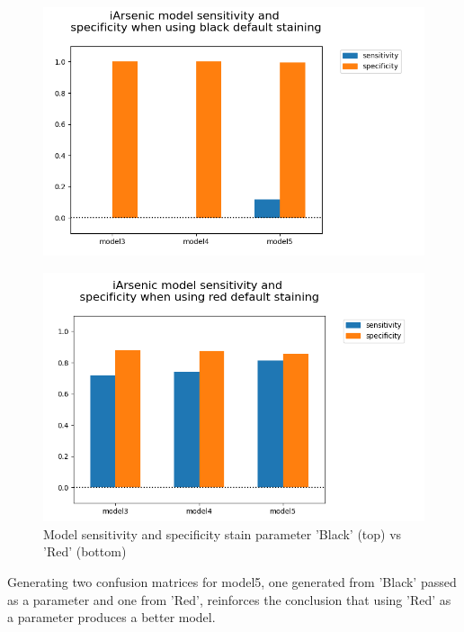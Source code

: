 \newpage

\begin{figure}[!htb]
    \centering
    \includegraphics[scale=0.55]{figures/ia_models_sensitivity_vs_specificity_black.png} 
    \label{fig:x ia_svs_black}

    \includegraphics[scale=0.55]{figures/iarsenic_model_sensitivity_vs_specificity_red.png} 
    \caption{Model sensitivity and specificity stain parameter 'Black' (top) vs 'Red' (bottom)}
    \label{fig:x ia_svs_red}
\end{figure}

\newpage

Generating two confusion matrices for model5, one generated from 'Black' passed as a parameter and one from 'Red', reinforces the conclusion that using 'Red' as a parameter produces a better model.

